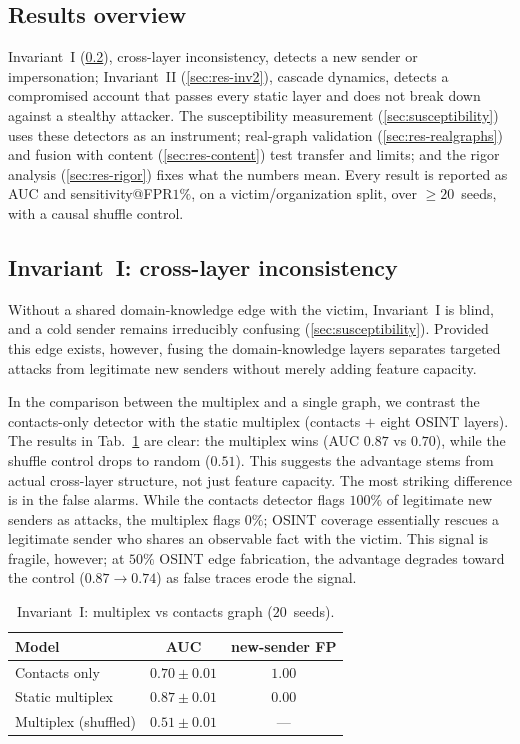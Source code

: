 \subsection{Results overview}
\label{sec:res-overview}
Invariant~I (\ref{sec:res-inv1}), cross-layer inconsistency, detects a new sender or impersonation;
Invariant~II (\ref{sec:res-inv2}), cascade dynamics, detects a
compromised account that passes every static layer and does not break down against a stealthy attacker. The
susceptibility measurement (\ref{sec:susceptibility}) uses these detectors as an instrument; real-graph
validation (\ref{sec:res-realgraphs}) and fusion with content (\ref{sec:res-content}) test transfer and limits;
and the rigor analysis (\ref{sec:res-rigor}) fixes what the numbers mean. Every result is reported as AUC and
sensitivity@FPR$1\%$, on a victim/organization split, over $\ge\!20$~seeds, with a causal shuffle control.

\subsection{Invariant~I: cross-layer inconsistency}
\label{sec:res-inv1}
Without a shared domain-knowledge edge with the victim, Invariant~I is blind, and a cold sender remains
irreducibly confusing (\ref{sec:susceptibility}). Provided this edge exists, however, fusing the
domain-knowledge layers separates targeted attacks from legitimate new senders without merely adding feature
capacity.

In the comparison between the multiplex and a single graph, we contrast the contacts-only detector with the static multiplex (contacts $+$ eight OSINT layers). The results in Tab.~\ref{tab:inv1} are clear: the multiplex wins (AUC $0.87$ vs $0.70$), while the shuffle control drops to random ($0.51$). This suggests the advantage stems from actual cross-layer structure, not just feature capacity. The most striking difference is in the false alarms. While the contacts detector flags $100\%$ of legitimate new senders as attacks, the multiplex flags $0\%$; OSINT coverage essentially rescues a legitimate sender who shares an observable fact with the victim. This signal is fragile, however; at $50\%$ OSINT edge fabrication, the advantage degrades toward the control ($0.87\!\to\!0.74$) as false traces erode the signal.

\begin{table}[t]\centering
\begin{tabular}{lcc}
\toprule
Model & AUC & new-sender FP \\
\midrule
Contacts only & $0.70 \pm 0.01$ & $1.00$ \\
Static multiplex & $\mathbf{0.87} \pm 0.01$ & $\mathbf{0.00}$ \\
Multiplex (shuffled) & $0.51 \pm 0.01$ & --- \\
\bottomrule
\end{tabular}
\caption{Invariant~I: multiplex vs contacts graph ($20$~seeds).}
\label{tab:inv1}
\end{table}

